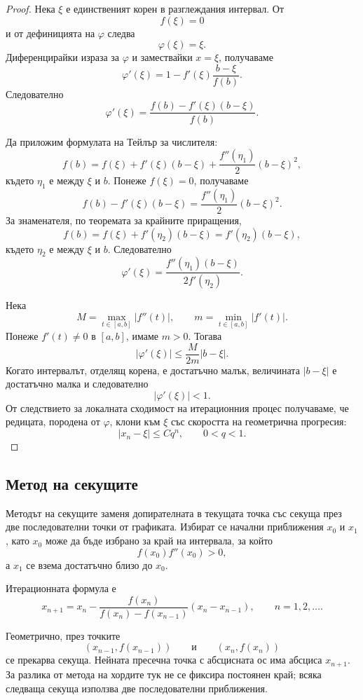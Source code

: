 \begin{proof}
Нека $\xi$ е единственият корен в разглеждания интервал. От
\[
f(\xi)=0
\]
и от дефиницията на $\varphi$ следва
\[
\varphi(\xi)=\xi.
\]
Диференцирайки израза за $\varphi$ и замествайки $x=\xi$, получаваме
\[
\varphi'(\xi)
=
1-
f'(\xi)\frac{b-\xi}{f(b)}.
\]
Следователно
\[
\varphi'(\xi)
=
\frac{f(b)-f'(\xi)(b-\xi)}{f(b)}.
\]

Да приложим формулата на Тейлър за числителя:
\[
f(b)
=
f(\xi)+f'(\xi)(b-\xi)
+
\frac{f''(\eta_1)}{2}(b-\xi)^2,
\]
където $\eta_1$ е между $\xi$ и $b$. Понеже $f(\xi)=0$, получаваме
\[
f(b)-f'(\xi)(b-\xi)
=
\frac{f''(\eta_1)}{2}(b-\xi)^2.
\]
За знаменателя, по теоремата за крайните приращения,
\[
f(b)=f(\xi)+f'(\eta_2)(b-\xi)
=
f'(\eta_2)(b-\xi),
\]
където $\eta_2$ е между $\xi$ и $b$. Следователно
\[
\varphi'(\xi)
=
\frac{f''(\eta_1)(b-\xi)}
{2f'(\eta_2)}.
\]

Нека
\[
M=\max_{t\in[a,b]}|f''(t)|,
\qquad
m=\min_{t\in[a,b]}|f'(t)|.
\]
Понеже $f'(t)\neq0$ в $[a,b]$, имаме $m>0$. Тогава
\[
|\varphi'(\xi)|
\leq
\frac{M}{2m}|b-\xi|.
\]
Когато интервалът, отделящ корена, е достатъчно малък, величината $|b-\xi|$ е достатъчно малка и следователно
\[
|\varphi'(\xi)|<1.
\]
От следствието за локалната сходимост на итерационния процес получаваме, че редицата, породена от $\varphi$, клони към $\xi$ със скоростта на геометрична прогресия:
\[
|x_n-\xi|\leq Cq^n,
\qquad 0<q<1.
\]
\end{proof}

\subsection{Метод на секущите}\label{s:34.4.2}

Методът на секущите заменя допирателната в текущата точка със секуща през две последователни точки от графиката. Избират се начални приближения $x_0$ и $x_1$, като $x_0$ може да бъде избрано за край на интервала, за който
\[
f(x_0)f''(x_0)>0,
\]
а $x_1$ се взема достатъчно близо до $x_0$.

Итерационната формула е
\[
x_{n+1}
=
x_n-
\frac{f(x_n)}
{f(x_n)-f(x_{n-1})}
(x_n-x_{n-1}),
\qquad n=1,2,\ldots.
\]

Геометрично, през точките
\[
(x_{n-1},f(x_{n-1}))
\qquad \text{и} \qquad
(x_n,f(x_n))
\]
се прекарва секуща. Нейната пресечна точка с абсцисната ос има абсциса $x_{n+1}$. За разлика от метода на хордите тук не се фиксира постоянен край; всяка следваща секуща използва две последователни приближения.

